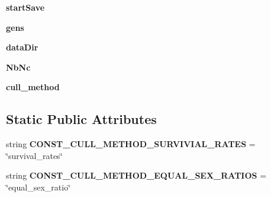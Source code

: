 \begin{DoxyCompactItemize}
\item 
{\bfseries start\+Save}\hypertarget{classnegui_1_1pginputsimupop_1_1PGInputSimuPop_a73ab30f9db93cfbd18580023886774d8}{}\label{classnegui_1_1pginputsimupop_1_1PGInputSimuPop_a73ab30f9db93cfbd18580023886774d8}

\item 
{\bfseries gens}\hypertarget{classnegui_1_1pginputsimupop_1_1PGInputSimuPop_aceb30da861b01f9f89e7b2d1fe78ba32}{}\label{classnegui_1_1pginputsimupop_1_1PGInputSimuPop_aceb30da861b01f9f89e7b2d1fe78ba32}

\item 
{\bfseries data\+Dir}\hypertarget{classnegui_1_1pginputsimupop_1_1PGInputSimuPop_a423a2c1ac08af8ba57663207700e5796}{}\label{classnegui_1_1pginputsimupop_1_1PGInputSimuPop_a423a2c1ac08af8ba57663207700e5796}

\item 
{\bfseries Nb\+Nc}\hypertarget{classnegui_1_1pginputsimupop_1_1PGInputSimuPop_a27c974f16a0d5a18fd811dafaa053bd9}{}\label{classnegui_1_1pginputsimupop_1_1PGInputSimuPop_a27c974f16a0d5a18fd811dafaa053bd9}

\item 
{\bfseries cull\+\_\+method}\hypertarget{classnegui_1_1pginputsimupop_1_1PGInputSimuPop_a7c529897ef0900ad932c09b94a50b4db}{}\label{classnegui_1_1pginputsimupop_1_1PGInputSimuPop_a7c529897ef0900ad932c09b94a50b4db}

\end{DoxyCompactItemize}
\subsection*{Static Public Attributes}
\begin{DoxyCompactItemize}
\item 
string {\bfseries C\+O\+N\+S\+T\+\_\+\+C\+U\+L\+L\+\_\+\+M\+E\+T\+H\+O\+D\+\_\+\+S\+U\+R\+V\+I\+V\+I\+A\+L\+\_\+\+R\+A\+T\+ES} = \char`\"{}survival\+\_\+rates\char`\"{}\hypertarget{classnegui_1_1pginputsimupop_1_1PGInputSimuPop_a4b5a5c2217d1929c9edffcf9e40bdcdb}{}\label{classnegui_1_1pginputsimupop_1_1PGInputSimuPop_a4b5a5c2217d1929c9edffcf9e40bdcdb}

\item 
string {\bfseries C\+O\+N\+S\+T\+\_\+\+C\+U\+L\+L\+\_\+\+M\+E\+T\+H\+O\+D\+\_\+\+E\+Q\+U\+A\+L\+\_\+\+S\+E\+X\+\_\+\+R\+A\+T\+I\+OS} = \char`\"{}equal\+\_\+sex\+\_\+ratio\char`\"{}\hypertarget{classnegui_1_1pginputsimupop_1_1PGInputSimuPop_a475049ff00dc47d34f4ceb7f507d3090}{}\label{classnegui_1_1pginputsimupop_1_1PGInputSimuPop_a475049ff00dc47d34f4ceb7f507d3090}

\end{DoxyCompactItemize}


